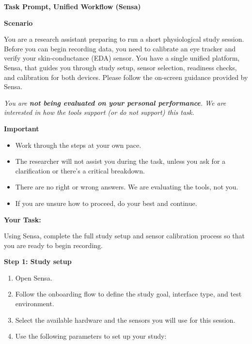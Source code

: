 \documentclass[
]{article}
\begin{document}
\textbf{Task Prompt, Unified Workflow (Sensa)}

\textbf{Scenario}

You are a research assistant preparing to run a short physiological study session. Before you can begin recording data, you need to calibrate an eye tracker and verify your skin-conductance (EDA) sensor. You have a single unified platform, Sensa, that guides you through study setup, sensor selection, readiness checks, and calibration for both devices. Please follow the on-screen guidance provided by Sensa.

\emph{You are \textbf{not being evaluated on your personal performance}. We are interested in how the tools support (or do not support) this task.}

\textbf{Important}

\begin{itemize}
\item
  Work through the steps at your own pace.
\item
  The researcher will not assist you during the task, unless you ask for a clarification or there's a critical breakdown.
\item
  There are no right or wrong answers. We are evaluating the tools, not you.
\item
  If you are unsure how to proceed, do your best and continue.
\end{itemize}

\textbf{Your Task:}

Using Sensa, complete the full study setup and sensor calibration process so that you are ready to begin recording.

\textbf{Step 1: Study setup}

\begin{enumerate}
\def\labelenumi{\arabic{enumi}.}
\item
  Open Sensa.
\item
  Follow the onboarding flow to define the study goal, interface type, and test environment.
\item
  Select the available hardware and the sensors you will use for this session.
\item
  Use the following parameters to set up your study:
\end{enumerate}
\end{document}
